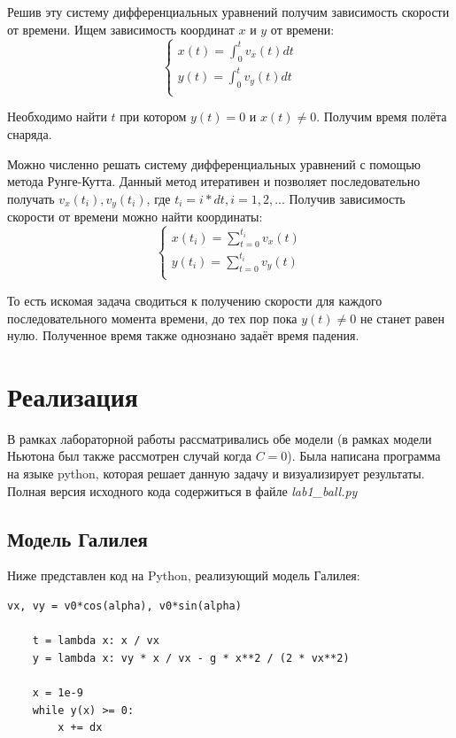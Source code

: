 \documentclass[12pt,a4paper,oneside]{extarticle}
\begin{document}
        Решив эту систему дифференциальных уравнений получим зависимость скорости от времени. Ищем зависимость координат $x$ и $y$ от времени: 
        \begin{equation*}
            \begin{cases}
                x(t)=\int_{0}^{t} v_x(t) dt \\
                y(t)=\int_{0}^{t} v_y(t) dt \\
            \end{cases}
        \end{equation*}

        Необходимо найти $t$ при котором $y(t)=0$ и $x(t)\neq0$. Получим время полёта снаряда. 
        
        Можно численно решать систему дифференциальных уравнений с помощью метода Рунге-Кутта. Данный метод итеративен и позволяет последовательно получать $v_x(t_i), v_y(t_i)$, где $t_i=i*dt, i=1,2,...$ Получив зависимость скорости от времени можно найти координаты: 
         \begin{equation*}
            \begin{cases}
                x(t_i)=\sum_{t=0}^{t_i} v_x(t) \\
                y(t_i)=\sum_{t=0}^{t_i} v_y(t) \\
            \end{cases}
        \end{equation*}

        То есть искомая задача сводиться к получению скорости для каждого последовательного момента времени, до тех пор пока $y(t)\neq0$ не станет равен нулю. Полученное время также однознано задаёт время падения.

\section{Реализация}
    В рамках лабораторной работы рассматривались обе модели (в рамках модели Ньютона был также рассмотрен случай когда $C=0$). Была написана программа на языке python, которая решает данную задачу и визуализирует результаты. Полная версия исходного кода содержиться в файле {\it lab1\_ball.py}

    \subsection{Модель Галилея}
    Ниже представлен код на Python, реализующий модель Галилея:
    \lstset{language=Python}
        \begin{lstlisting}[mathescape] 
    vx, vy = v0*cos(alpha), v0*sin(alpha)

    t = lambda x: x / vx
    y = lambda x: vy * x / vx - g * x**2 / (2 * vx**2)

    x = 1e-9
    while y(x) >= 0:
        x += dx
    \end{lstlisting}
\end{document}
